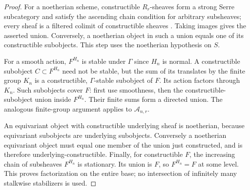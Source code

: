 \documentclass[11pt]{article}
\theoremstyle{definition}
\theoremstyle{remark}
\begin{document}
\begin{proof}
For a noetherian scheme, constructible $R_r$-sheaves form a strong Serre
subcategory and satisfy the ascending chain condition for arbitrary
subsheaves; every sheaf is a filtered colimit of constructible sheaves
\cite[Sections 59.73--59.74]{StacksConstructibleNoetherian}.
Taking images gives the asserted union.  Conversely, a noetherian object
in such a union equals one of its constructible subobjects.  This step uses the noetherian hypothesis on $S$.

For a smooth action, $F^{H_n}$ is stable under $\Gamma$ since $H_n$ is
normal.  A constructible subobject $C\subset F^{H_n}$ need not be stable,
but the sum of its translates by the finite group $K_n$ is a
constructible, $\Gamma$-stable subobject of $F$.  Its action factors
through $K_n$.  Such subobjects cover $F$: first use smoothness, then
the constructible-subobject union inside $F^{H_n}$.  Their finite sums
form a directed union.  The analogous finite-group argument applies
to $\mathcal A_{n,r}$.

An equivariant object with constructible underlying sheaf is noetherian,
because equivariant subobjects are underlying subobjects.  Conversely a
noetherian equivariant object must equal one member of the union just
constructed, and is therefore underlying-constructible.  Finally, for
constructible $F$, the increasing chain of subsheaves $F^{H_n}$ is
stationary.  Its union is $F$, so $F^{H_n}=F$ at some level.  This proves
factorization on the entire base; no intersection of infinitely many
stalkwise stabilizers is used.
\end{proof}
\end{document}

